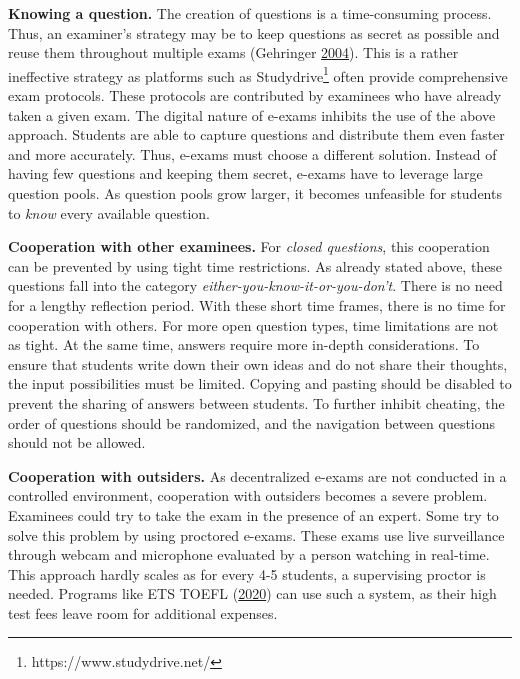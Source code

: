 \textbf{Knowing a question.} The creation of questions is a
time-consuming process. Thus, an examiner's strategy may be to keep
questions as secret as possible and reuse them throughout multiple exams
(Gehringer \protect\hyperlink{ref-Gehringer2004}{2004}). This is a
rather ineffective strategy as platforms such as Studydrive\footnote{https://www.studydrive.net/}
often provide comprehensive exam protocols. These protocols are
contributed by examinees who have already taken a given exam. The
digital nature of e-exams inhibits the use of the above approach.
Students are able to capture questions and distribute them even faster
and more accurately. Thus, e-exams must choose a different solution.
Instead of having few questions and keeping them secret, e-exams have to
leverage large question pools. As question pools grow larger, it becomes
unfeasible for students to \emph{know} every available question.

\textbf{Cooperation with other examinees.} For \emph{closed questions},
this cooperation can be prevented by using tight time restrictions. As
already stated above, these questions fall into the category
\emph{either-you-know-it-or-you-don't}. There is no need for a lengthy
reflection period. With these short time frames, there is no time for
cooperation with others. For more open question types, time limitations
are not as tight. At the same time, answers require more in-depth
considerations. To ensure that students write down their own ideas and
do not share their thoughts, the input possibilities must be limited.
Copying and pasting should be disabled to prevent the sharing of answers
between students. To further inhibit cheating, the order of questions
should be randomized, and the navigation between questions should not be
allowed.

\textbf{Cooperation with outsiders.} As decentralized e-exams are not
conducted in a controlled environment, cooperation with outsiders
becomes a severe problem. Examinees could try to take the exam in the
presence of an expert. Some try to solve this problem by using proctored
e-exams. These exams use live surveillance through webcam and microphone
evaluated by a person watching in real-time. This approach hardly scales
as for every 4-5 students, a supervising proctor is needed. Programs
like ETS TOEFL (\protect\hyperlink{ref-ETSTOEFL}{2020}) can use such a
system, as their high test fees leave room for additional expenses.

